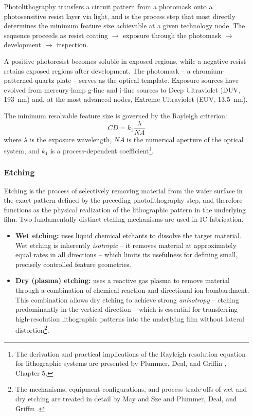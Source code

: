 \documentclass[10pt,a4paper]{article}
\begin{document}
Photolithography transfers a circuit pattern from a photomask onto a 
photosensitive resist layer via light, and is the process step that most 
directly determines the minimum feature size achievable at a given technology 
node. The sequence proceeds as resist coating $\rightarrow$ exposure through 
the photomask $\rightarrow$ development $\rightarrow$ inspection.

A positive photoresist becomes soluble in exposed regions, while a negative 
resist retains exposed regions after development. The photomask -- a 
chromium-patterned quartz plate -- serves as the optical template. Exposure 
sources have evolved from mercury-lamp g-line and i-line sources to Deep 
Ultraviolet (DUV, 193~nm) and, at the most advanced nodes, Extreme Ultraviolet 
(EUV, 13.5~nm).

The minimum resolvable feature size is governed by the Rayleigh criterion:
$$ CD = k_1 \frac{\lambda}{NA} $$
where $\lambda$ is the exposure wavelength, $NA$ is the numerical aperture of 
the optical system, and $k_1$ is a process-dependent 
coefficient\footnote{The derivation and practical implications of the Rayleigh 
resolution equation for lithographic systems are presented by Plummer, Deal, 
and Griffin \cite{plummer2000}, Chapter 5.}.

\subsubsection{Etching}

Etching is the process of selectively removing material from the wafer surface 
in the exact pattern defined by the preceding photolithography step, and 
therefore functions as the physical realization of the lithographic pattern in 
the underlying film. Two fundamentally distinct etching mechanisms are used in 
IC fabrication.

\begin{itemize}
    \item \textbf{Wet etching:} uses liquid chemical etchants to dissolve the 
    target material. Wet etching is inherently \textit{isotropic} -- it removes 
    material at approximately equal rates in all directions -- which limits its 
    usefulness for defining small, precisely controlled feature geometries.
    \item \textbf{Dry (plasma) etching:} uses a reactive gas plasma to remove 
    material through a combination of chemical reaction and directional ion 
    bombardment. This combination allows dry etching to achieve strong 
    \textit{anisotropy} -- etching predominantly in the vertical direction -- 
    which is essential for transferring high-resolution lithographic patterns 
    into the underlying film without lateral 
    distortion\footnote{The mechanisms, equipment configurations, and process 
    trade-offs of wet and dry etching are treated in detail by May and Sze 
    \cite{maysze2004} and Plummer, Deal, and Griffin \cite{plummer2000}.}.
\end{itemize}
\end{document}
